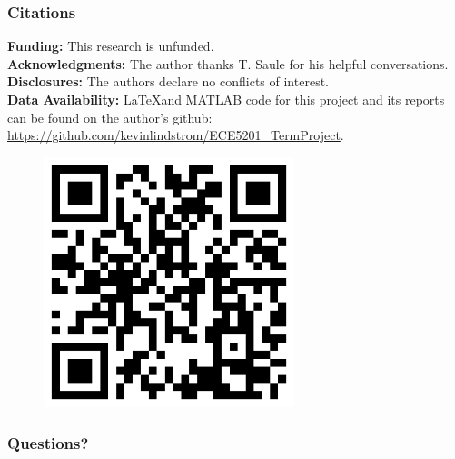 \documentclass[aspectratio=169,t,xcolor=table]{beamer}
\begin{document}
\begin{frame}
    \frametitle{Citations}
    \vspace{-1.25em}
    \tiny
    \vspace{1em}
    \begin{minipage}[t]{0.6\textwidth}
        \vspace{-6em}
        
        \textbf{Funding:}
        This research is unfunded.\vspace{0.7em}\noindent\\
        \vspace{0.7em}\noindent
        \textbf{Acknowledgments:}
        The author thanks T. Saule
        for his helpful conversations.\\
        \vspace{0.7em}\noindent
        \textbf{Disclosures:}
        The authors declare no conflicts of interest.\\
        \textbf{Data Availability:} \LaTeX and MATLAB code for this project and
        its reports can be found on the author's github:\\
        \url{https://github.com/kevinlindstrom/ECE5201_TermProject}.
    \end{minipage}
    \begin{minipage}{0.35\textwidth}
        \begin{figure}[H]
            \centering
            \includegraphics[width=0.65\textwidth]{figs/Github.png}
        \end{figure}
    \end{minipage}
   
\end{frame}


\begin{frame}
    \frametitle{Questions?}
\end{frame}
\end{document}
